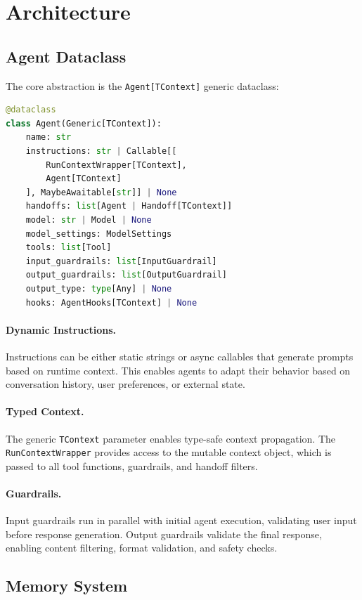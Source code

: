 \documentclass[11pt,twocolumn]{article}
\begin{document}
\section{Architecture}

\subsection{Agent Dataclass}

The core abstraction is the \texttt{Agent[TContext]} generic dataclass:

\begin{lstlisting}[language=Python]
@dataclass
class Agent(Generic[TContext]):
    name: str
    instructions: str | Callable[[
        RunContextWrapper[TContext],
        Agent[TContext]
    ], MaybeAwaitable[str]] | None
    handoffs: list[Agent | Handoff[TContext]]
    model: str | Model | None
    model_settings: ModelSettings
    tools: list[Tool]
    input_guardrails: list[InputGuardrail]
    output_guardrails: list[OutputGuardrail]
    output_type: type[Any] | None
    hooks: AgentHooks[TContext] | None
\end{lstlisting}

\paragraph{Dynamic Instructions.} Instructions can be either static strings or async callables that generate prompts based on runtime context. This enables agents to adapt their behavior based on conversation history, user preferences, or external state.

\paragraph{Typed Context.} The generic \texttt{TContext} parameter enables type-safe context propagation. The \texttt{RunContextWrapper} provides access to the mutable context object, which is passed to all tool functions, guardrails, and handoff filters.

\paragraph{Guardrails.} Input guardrails run in parallel with initial agent execution, validating user input before response generation. Output guardrails validate the final response, enabling content filtering, format validation, and safety checks.

\subsection{Memory System}
\end{document}
